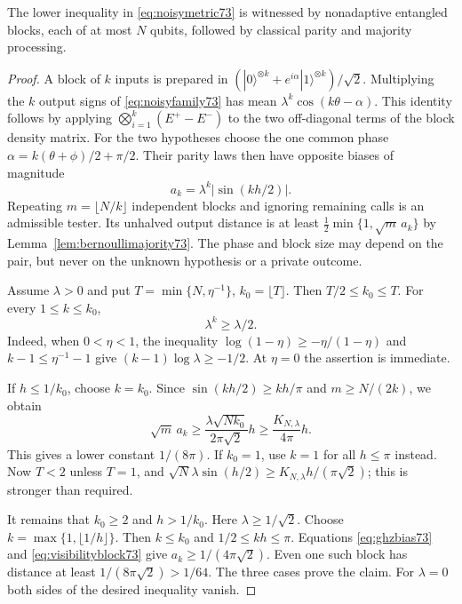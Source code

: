 \begin{lemma}\label{lem:noisylower73}
The lower inequality in \eqref{eq:noisymetric73} is witnessed by
nonadaptive entangled blocks, each of at most $N$ qubits, followed by
classical parity and majority processing.
\end{lemma}
\begin{proof}
A block of $k$ inputs is prepared in
$(|0\rangle^{\otimes k}+e^{i\alpha}|1\rangle^{\otimes k})/\sqrt2$.
Multiplying the $k$ output signs of \eqref{eq:noisyfamily73} has mean
$\lambda^k\cos(k\theta-\alpha)$. This identity follows by applying
$\bigotimes_{i=1}^k(E^+-E^-)$ to the two off-diagonal terms of the
block density matrix. For the two hypotheses choose the one common
phase $\alpha=k(\theta+\phi)/2+\pi/2$. Their parity laws then have
opposite biases of magnitude
\begin{equation}\label{eq:ghzbias73}
                        a_k=\lambda^k|\sin(kh/2)|.
\end{equation}
Repeating $m=\lfloor N/k\rfloor$ independent blocks and ignoring
remaining calls is an admissible tester. Its unhalved output distance
is at least $\tfrac12\min\{1,\sqrt m\,a_k\}$ by
Lemma~\ref{lem:bernoullimajority73}. The phase and block size may depend
on the pair, but never on the unknown hypothesis or a private outcome.

Assume $\lambda>0$ and put
$T=\min\{N,\eta^{-1}\}$, $k_0=\lfloor T\rfloor$. Then
$T/2\le k_0\le T$. For every $1\le k\le k_0$,
\begin{equation}\label{eq:visibilityblock73}
                              \lambda^k\ge\lambda/2.
\end{equation}
Indeed, when $0<\eta<1$, the inequality
$\log(1-\eta)\ge-\eta/(1-\eta)$ and
$k-1\le\eta^{-1}-1$ give $(k-1)\log\lambda\ge-1/2$.
At $\eta=0$ the assertion is immediate.

If $h\le1/k_0$, choose $k=k_0$. Since
$\sin(kh/2)\ge kh/\pi$ and $m\ge N/(2k)$, we obtain
\[
 \sqrt m\,a_k\ge
 \frac{\lambda\sqrt{Nk_0}}{2\pi\sqrt2}h
 \ge\frac{K_{N,\lambda}}{4\pi}h.
\]
This gives a lower constant $1/(8\pi)$.
If $k_0=1$, use $k=1$ for all $h\le\pi$ instead. Now $T<2$
unless $T=1$, and $\sqrt N\lambda\sin(h/2)\ge
K_{N,\lambda}h/(\pi\sqrt2)$; this is stronger than required.

It remains that $k_0\ge2$ and $h>1/k_0$. Here
$\lambda\ge1/\sqrt2$. Choose $k=\max\{1,\lfloor1/h\rfloor\}$.
Then $k\le k_0$ and $1/2\le kh\le\pi$. Equations
\eqref{eq:ghzbias73} and \eqref{eq:visibilityblock73} give
$a_k\ge1/(4\pi\sqrt2)$. Even one such block has distance at least
$1/(8\pi\sqrt2)>1/64$. The three cases prove the claim.
For $\lambda=0$ both sides of the desired inequality vanish.
\end{proof}

